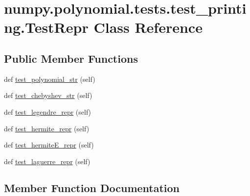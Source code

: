 \hypertarget{classnumpy_1_1polynomial_1_1tests_1_1test__printing_1_1TestRepr}{}\section{numpy.\+polynomial.\+tests.\+test\+\_\+printing.\+Test\+Repr Class Reference}
\label{classnumpy_1_1polynomial_1_1tests_1_1test__printing_1_1TestRepr}
\subsection*{Public Member Functions}
\begin{DoxyCompactItemize}
\item 
def \hyperlink{classnumpy_1_1polynomial_1_1tests_1_1test__printing_1_1TestRepr_a165a5f0b3172955698e604e2a4fc5e04}{test\+\_\+polynomial\+\_\+str} (self)
\item 
def \hyperlink{classnumpy_1_1polynomial_1_1tests_1_1test__printing_1_1TestRepr_a0afd5fc44a4f7124ab95783ed9509909}{test\+\_\+chebyshev\+\_\+str} (self)
\item 
def \hyperlink{classnumpy_1_1polynomial_1_1tests_1_1test__printing_1_1TestRepr_a833dbcc66c53b0e1e6a08a36b4c74e57}{test\+\_\+legendre\+\_\+repr} (self)
\item 
def \hyperlink{classnumpy_1_1polynomial_1_1tests_1_1test__printing_1_1TestRepr_a427b5fb85a11b8d6ffcd3b949f53f7b5}{test\+\_\+hermite\+\_\+repr} (self)
\item 
def \hyperlink{classnumpy_1_1polynomial_1_1tests_1_1test__printing_1_1TestRepr_a987c8b7f19d0fb770a51d40fbd6ff6d3}{test\+\_\+hermite\+E\+\_\+repr} (self)
\item 
def \hyperlink{classnumpy_1_1polynomial_1_1tests_1_1test__printing_1_1TestRepr_afe046914cda18ca277896f287a122489}{test\+\_\+laguerre\+\_\+repr} (self)
\end{DoxyCompactItemize}


\subsection{Member Function Documentation}
\mbox{\label{classnumpy_1_1polynomial_1_1tests_1_1test__printing_1_1TestRepr_a0afd5fc44a4f7124ab95783ed9509909}} 

